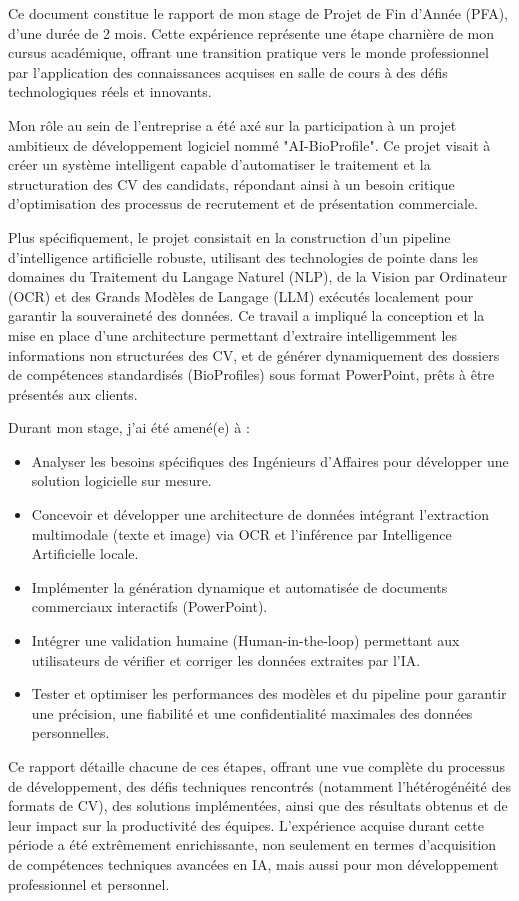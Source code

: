 


Ce document constitue le rapport de mon stage de Projet de Fin d'Année (PFA), d'une durée de 2 mois. Cette expérience représente une étape charnière de mon cursus académique, offrant une transition pratique vers le monde professionnel par l'application des connaissances acquises en salle de cours à des défis technologiques réels et innovants.

Mon rôle au sein de l'entreprise a été axé sur la participation à un projet ambitieux de développement logiciel nommé "AI-BioProfile". Ce projet visait à créer un système intelligent capable d'automatiser le traitement et la structuration des CV des candidats, répondant ainsi à un besoin critique d'optimisation des processus de recrutement et de présentation commerciale.

Plus spécifiquement, le projet consistait en la construction d'un pipeline d'intelligence artificielle robuste, utilisant des technologies de pointe dans les domaines du Traitement du Langage Naturel (NLP), de la Vision par Ordinateur (OCR) et des Grands Modèles de Langage (LLM) exécutés localement pour garantir la souveraineté des données. Ce travail a impliqué la conception et la mise en place d'une architecture permettant d'extraire intelligemment les informations non structurées des CV, et de générer dynamiquement des dossiers de compétences standardisés (BioProfiles) sous format PowerPoint, prêts à être présentés aux clients.

Durant mon stage, j'ai été amené(e) à :
\begin{itemize}
    \item Analyser les besoins spécifiques des Ingénieurs d'Affaires pour développer une solution logicielle sur mesure.
    \item Concevoir et développer une architecture de données intégrant l'extraction multimodale (texte et image) via OCR et l'inférence par Intelligence Artificielle locale.
    \item Implémenter la génération dynamique et automatisée de documents commerciaux interactifs (PowerPoint).
    \item Intégrer une validation humaine (Human-in-the-loop) permettant aux utilisateurs de vérifier et corriger les données extraites par l'IA.
    \item Tester et optimiser les performances des modèles et du pipeline pour garantir une précision, une fiabilité et une confidentialité maximales des données personnelles.
\end{itemize}

Ce rapport détaille chacune de ces étapes, offrant une vue complète du processus de développement, des défis techniques rencontrés (notamment l'hétérogénéité des formats de CV), des solutions implémentées, ainsi que des résultats obtenus et de leur impact sur la productivité des équipes. L'expérience acquise durant cette période a été extrêmement enrichissante, non seulement en termes d'acquisition de compétences techniques avancées en IA, mais aussi pour mon développement professionnel et personnel.
